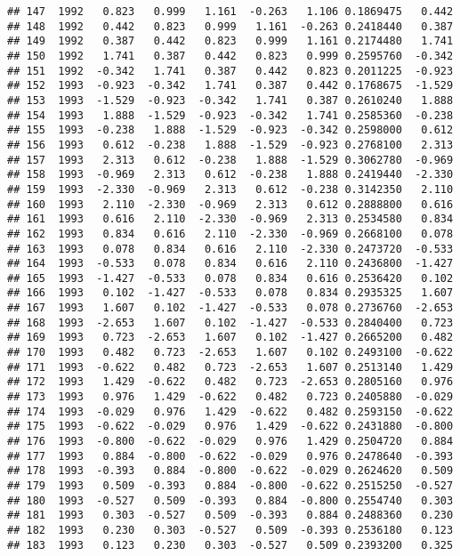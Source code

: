 \documentclass[]{article}
\begin{document}
\begin{verbatim}
## 147  1992   0.823   0.999   1.161  -0.263   1.106 0.1869475   0.442
## 148  1992   0.442   0.823   0.999   1.161  -0.263 0.2418440   0.387
## 149  1992   0.387   0.442   0.823   0.999   1.161 0.2174480   1.741
## 150  1992   1.741   0.387   0.442   0.823   0.999 0.2595760  -0.342
## 151  1992  -0.342   1.741   0.387   0.442   0.823 0.2011225  -0.923
## 152  1993  -0.923  -0.342   1.741   0.387   0.442 0.1768675  -1.529
## 153  1993  -1.529  -0.923  -0.342   1.741   0.387 0.2610240   1.888
## 154  1993   1.888  -1.529  -0.923  -0.342   1.741 0.2585360  -0.238
## 155  1993  -0.238   1.888  -1.529  -0.923  -0.342 0.2598000   0.612
## 156  1993   0.612  -0.238   1.888  -1.529  -0.923 0.2768100   2.313
## 157  1993   2.313   0.612  -0.238   1.888  -1.529 0.3062780  -0.969
## 158  1993  -0.969   2.313   0.612  -0.238   1.888 0.2419440  -2.330
## 159  1993  -2.330  -0.969   2.313   0.612  -0.238 0.3142350   2.110
## 160  1993   2.110  -2.330  -0.969   2.313   0.612 0.2888800   0.616
## 161  1993   0.616   2.110  -2.330  -0.969   2.313 0.2534580   0.834
## 162  1993   0.834   0.616   2.110  -2.330  -0.969 0.2668100   0.078
## 163  1993   0.078   0.834   0.616   2.110  -2.330 0.2473720  -0.533
## 164  1993  -0.533   0.078   0.834   0.616   2.110 0.2436800  -1.427
## 165  1993  -1.427  -0.533   0.078   0.834   0.616 0.2536420   0.102
## 166  1993   0.102  -1.427  -0.533   0.078   0.834 0.2935325   1.607
## 167  1993   1.607   0.102  -1.427  -0.533   0.078 0.2736760  -2.653
## 168  1993  -2.653   1.607   0.102  -1.427  -0.533 0.2840400   0.723
## 169  1993   0.723  -2.653   1.607   0.102  -1.427 0.2665200   0.482
## 170  1993   0.482   0.723  -2.653   1.607   0.102 0.2493100  -0.622
## 171  1993  -0.622   0.482   0.723  -2.653   1.607 0.2513140   1.429
## 172  1993   1.429  -0.622   0.482   0.723  -2.653 0.2805160   0.976
## 173  1993   0.976   1.429  -0.622   0.482   0.723 0.2405880  -0.029
## 174  1993  -0.029   0.976   1.429  -0.622   0.482 0.2593150  -0.622
## 175  1993  -0.622  -0.029   0.976   1.429  -0.622 0.2431880  -0.800
## 176  1993  -0.800  -0.622  -0.029   0.976   1.429 0.2504720   0.884
## 177  1993   0.884  -0.800  -0.622  -0.029   0.976 0.2478640  -0.393
## 178  1993  -0.393   0.884  -0.800  -0.622  -0.029 0.2624620   0.509
## 179  1993   0.509  -0.393   0.884  -0.800  -0.622 0.2515250  -0.527
## 180  1993  -0.527   0.509  -0.393   0.884  -0.800 0.2554740   0.303
## 181  1993   0.303  -0.527   0.509  -0.393   0.884 0.2488360   0.230
## 182  1993   0.230   0.303  -0.527   0.509  -0.393 0.2536180   0.123
## 183  1993   0.123   0.230   0.303  -0.527   0.509 0.2393200   0.325

\end{verbatim}
\end{document}
